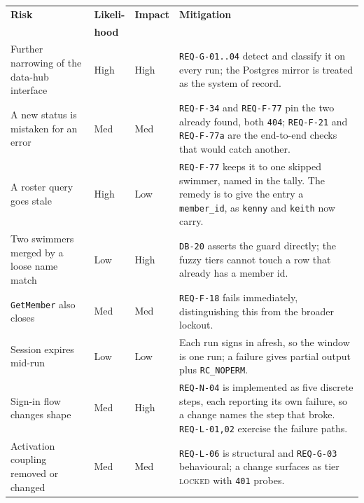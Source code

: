 \documentclass[12pt]{article}
\newcommand{\code}[1]{\texttt{#1}}
\newcommand{\req}[1]{\texttt{#1}}
\begin{document}
\begin{center}
\begin{longtable}{p{4.0cm}p{1.5cm}p{1.5cm}p{6cm}}
  \toprule
  \textbf{Risk} & \textbf{Likeli-} & \textbf{Impact} & \textbf{Mitigation} \\
                & \textbf{hood}    &                 & \\
  \midrule\endhead
  Further narrowing of the data-hub interface
      & High & High & \req{REQ-G-01..04} detect and classify it on
                      every run; the Postgres mirror is treated as the
                      system of record. \\
  A new status is mistaken for an error
      & Med  & Med  & \req{REQ-F-34} and \req{REQ-F-77} pin the two
                      already found, both \code{404}; \req{REQ-F-21}
                      and \req{REQ-F-77a} are the end-to-end checks
                      that would catch another. \\
  A roster query goes stale
      & High & Low  & \req{REQ-F-77} keeps it to one skipped swimmer,
                      named in the tally.  The remedy is to give the
                      entry a \code{member\_id}, as \code{kenny} and
                      \code{keith} now carry. \\
  Two swimmers merged by a loose name match
      & Low  & High & \req{DB-20} asserts the guard directly; the
                      fuzzy tiers cannot touch a row that already has
                      a member id. \\
  \code{GetMember} also closes
      & Med  & Med  & \req{REQ-F-18} fails immediately, distinguishing
                      this from the broader lockout. \\
  Session expires mid-run
      & Low  & Low  & Each run signs in afresh, so the window is one
                      run; a failure gives partial output plus
                      \code{RC\_NOPERM}. \\
  Sign-in flow changes shape
      & Med  & High & \req{REQ-N-04} is implemented as five discrete
                      steps, each reporting its own failure, so a
                      change names the step that broke.
                      \req{REQ-L-01,02} exercise the failure paths. \\
  Activation coupling removed or changed
      & Med  & Med  & \req{REQ-L-06} is structural and \req{REQ-G-03}
                      behavioural; a change surfaces as tier
                      \textsc{locked} with \code{401} probes. \\

\end{longtable}
\end{center}
\end{document}
